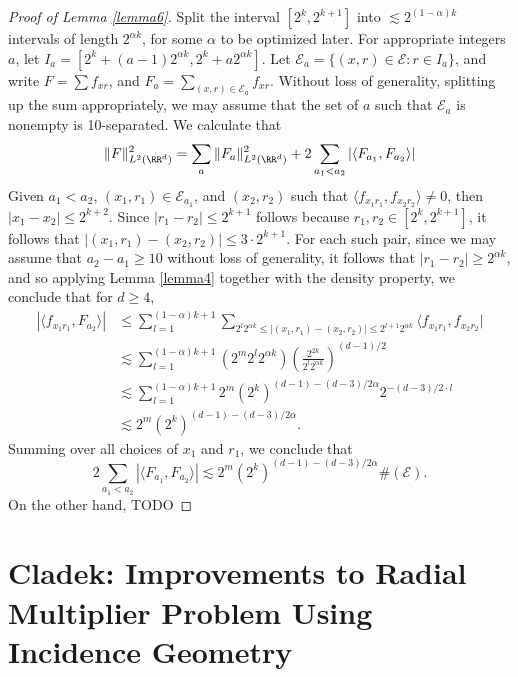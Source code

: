 \begin{proof}[Proof of Lemma \ref{lemma6}]
    Split the interval $[2^k,2^{k+1}]$ into $\lesssim 2^{(1 - \alpha)k}$ intervals of length $2^{\alpha k}$, for some $\alpha$ to be optimized later. For appropriate integers $a$, let $I_a = [2^k + (a-1) 2^{\alpha k}, 2^k + a 2^{\alpha k}]$. Let $\mathcal{E}_a = \{ (x,r) \in \mathcal{E}: r \in I_a \}$, and write $F = \sum f_{xr}$, and $F_a = \sum_{(x,r) \in \mathcal{E}_a} f_{xr}$. Without loss of generality, splitting up the sum appropriately, we may assume that the set of $a$ such that $\mathcal{E}_a$ is nonempty is 10-separated. We calculate that
    \[ \| F \|_{L^2(\RR^d)}^2 = \sum_a \| F_a \|_{L^2(\RR^d)}^2 + 2 \sum_{a_1 < a_2} |\langle F_{a_1}, F_{a_2} \rangle| \]
    Given $a_1 < a_2$, $(x_1,r_1) \in \mathcal{E}_{a_1}$, and $(x_2,r_2)$ such that $\langle f_{x_1r_1}, f_{x_2r_2} \rangle \neq 0$, then $|x_1 - x_2| \leq 2^{k+2}$. Since $|r_1 - r_2| \leq 2^{k+1}$ follows because $r_1,r_2 \in [2^k,2^{k+1}]$, it follows that $|(x_1,r_1) - (x_2,r_2)| \leq 3 \cdot 2^{k+1}$. For each such pair, since we may assume that $a_2 - a_1 \geq 10$ without loss of generality, it follows that $|r_1 - r_2| \geq 2^{\alpha k}$, and so applying Lemma \ref{lemma4} together with the density property, we conclude that for $d \geq 4$,
    \begin{align*}
        |\langle f_{x_1r_1}, F_{a_2} \rangle| &\leq \sum_{l = 1}^{(1 - \alpha)k + 1} \sum_{2^l 2^{\alpha k} \leq |(x_1,r_1) - (x_2,r_2)| \leq 2^{l+1} 2^{\alpha k}} \langle f_{x_1r_1}, f_{x_2r_2}|\\
        &\lesssim \sum_{l = 1}^{(1 - \alpha)k + 1} (2^m 2^l 2^{\alpha k}) \left( \frac{2^{2k}}{2^l 2^{\alpha k}} \right)^{(d-1)/2}\\
        &\lesssim \sum_{l = 1}^{(1 - \alpha)k + 1} 2^m (2^k)^{ (d-1) - (d-3)/2 \alpha } 2^{-(d-3)/2 \cdot l}\\
        &\lesssim 2^m (2^k)^{(d-1) - (d-3)/2 \alpha}.
    \end{align*}
    Summing over all choices of $x_1$ and $r_1$, we conclude that
    \[ 2 \sum_{a_1 < a_2} |\langle F_{a_1}, F_{a_2} \rangle| \lesssim 2^m (2^k)^{(d-1) - (d-3)/2 \alpha} \#(\mathcal{E}). \]
    On the other hand, TODO
\end{proof}

\chapter{Cladek: Improvements to Radial Multiplier Problem Using Incidence Geometry}

